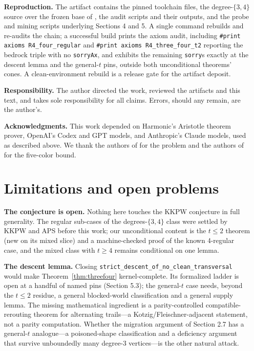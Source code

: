 \documentclass[11pt]{article}
\theoremstyle{definition}
\theoremstyle{remark}
\begin{document}
\textbf{Reproduction.} The artifact contains the pinned toolchain files, the degree-$\{3,4\}$ source over the frozen base of \cite{E5}, the audit scripts and their outputs, and the probe and mining scripts underlying Sections 4 and 5. A single command rebuilds and re-audits the chain; a successful build prints the axiom audit, including \texttt{\#print axioms R4\_four\_regular} and \texttt{\#print axioms R4\_three\_four\_t2} reporting the bedrock triple with no \texttt{sorryAx}, and exhibits the remaining \texttt{sorry}s exactly at the descent lemma and the general-$t$ pins, outside both unconditional theorems' cones. A clean-environment rebuild is a release gate for the artifact deposit.

\textbf{Responsibility.} The author directed the work, reviewed the artifacts and this text, and takes sole responsibility for all claims. Errors, should any remain, are the author's.

\textbf{Acknowledgments.} This work depended on Harmonic's Aristotle theorem prover, OpenAI's Codex and GPT models, and Anthropic's Claude models, used as described above. We thank the authors of \cite{KKPW} for the problem and the authors of \cite{APS} for the five-color bound.

\section{Limitations and open problems}\label{7-open-problems}

\textbf{The conjecture is open.} Nothing here touches the KKPW conjecture in full generality. The regular sub-cases of the degrees-$\{3,4\}$ class were settled by KKPW and APS before this work; our unconditional content is the $t \le 2$ theorem (new on its mixed slice) and a machine-checked proof of the known 4-regular case, and the mixed class with $t \ge 4$ remains conditional on one lemma.

\textbf{The descent lemma.} Closing \texttt{strict\_descent\_of\_no\_clean\_transversal} would make Theorem~\ref{thm:threefour} kernel-complete. Its formalized ladder is open at a handful of named pins (Section 5.3); the general-$t$ case needs, beyond the $t \le 2$ residue, a general blocked-world classification and a general supply lemma. The missing mathematical ingredient is a parity-controlled compatible-rerouting theorem for alternating trails---a Kotzig/Fleischner-adjacent statement, not a parity computation. Whether the migration argument of Section 2.7 has a general-$t$ analogue---a poisoned-shape classification and a deficiency argument that survive unboundedly many degree-3 vertices---is the other natural attack.
\end{document}
